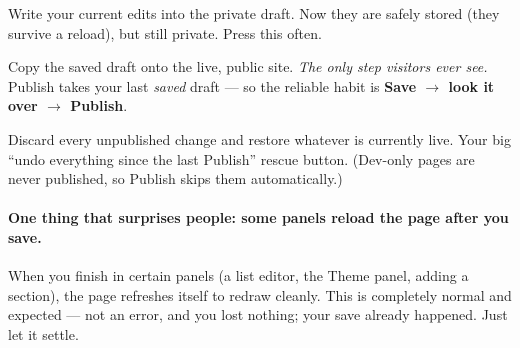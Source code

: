 \documentclass[11pt]{article}
\begin{document}
\begin{center}
\end{center}

\begin{description}[style=nextline,leftmargin=1.4em]
  \item[Save draft] Write your current edits into the private draft. Now they are
    safely stored (they survive a reload), but still private. Press this often.
  \item[Publish] Copy the saved draft onto the live, public site. \emph{The only step
    visitors ever see.} Publish takes your last \emph{saved} draft --- so the reliable
    habit is \textbf{Save $\rightarrow$ look it over $\rightarrow$ Publish}.
  \item[Revert] Discard every unpublished change and restore whatever is currently
    live. Your big ``undo everything since the last Publish'' rescue button. (Dev-only
    pages are never published, so Publish skips them automatically.)
\end{description}

\paragraph{One thing that surprises people: some panels reload the page after you
save.} When you finish in certain panels (a list editor, the Theme panel, adding a
section), the page refreshes itself to redraw cleanly. This is completely normal and
expected --- not an error, and you lost nothing; your save already happened. Just let
it settle.
\end{document}

